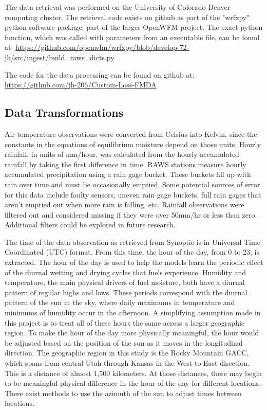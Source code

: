 
The data retrieval was performed on the University of Colorado Denver computing cluster. The retrieval code exists on github as part of the "wrfxpy" python software package, part of the larger OpenWFM project. The exact python function, which was called with parameters from an executable file, can be found at: \url{https://github.com/openwfm/wrfxpy/blob/develop-72-jh/src/ingest/build_raws_dicts.py}

The code for the data processing can be found on github at: \url{https://github.com/jh-206/Custom-Loss-FMDA}

\subsection*{Data Transformations}

Air temperature observations were converted from Celsius into Kelvin, since the constants in the equations of equilibrium moisture depend on those units. Hourly rainfall, in units of mm/hour, was calculated from the hourly accumulated rainfall by taking the first difference in time. RAWS stations measure hourly accumulated precipitation using a rain gage bucket. These buckets fill up with rain over time and must be occasionally emptied. Some potential sources of error for this data include faulty sensors, uneven rain gage buckets, full rain gages that aren't emptied out when more rain is falling, etc. \cite{Campbell-2017-RMM} Rainfall observations were filtered out and considered missing if they were over 50mm/hr or less than zero. Additional filters could be explored in future research.

The time of the data observation as retrieved from Synoptic is in Universal Time Coordinated (UTC) format. From this time, the hour of the day, from 0 to 23, is extracted. The hour of the day is used to help the models learn the periodic effect of the diurnal wetting and drying cycles that fuels experience. Humidity and temperature, the main physical drivers of fuel moisture, both have a diurnal pattern of regular highs and lows. These periods correspond with the diurnal pattern of the sun in the sky, where daily maximums in temperature and minimums of humidity occur in the afternoon. A simplifying assumption made in this project is to treat all of these hours the same across a larger geographic region. To make the hour of the day more physically meaningful, the hour would be adjusted based on the position of the sun as it moves in the longitudinal direction. The geographic region in this study is the Rocky Mountain GACC, which spans from central Utah through Kansas in the West to East direction. This is a distance of almost 1,500 kilometers. At those distances, there may begin to be meaningful physical difference in the hour of the day for different locations. There exist methods to use the azimuth of the sun to adjust times between locations.

